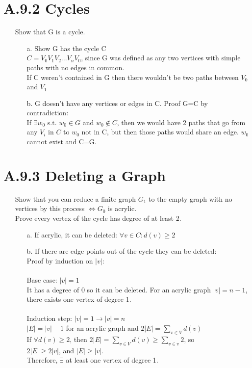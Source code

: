 \documentclass[12pt]{article}
\begin{document}
\section*{A.9.2 Cycles}
\begin{enumerate}
  \item[] Show that G is a cycle.
    \begin{enumerate}
      \item[a.] Show G has the cycle C
        \\ $C = V_0V_1V_2...V_nV_0$, since G was defined as any two vertices with simple paths with no edges in common.
        \\ If C weren't contained in G then there wouldn't be two paths between $V_0$ and $V_1$
      \item[b.]G doesn't have any vertices or edges in C. Proof G=C by contradiction:
        \\ If $\exists w_0$ s.t. $w_0\in G$ and $w_0 \notin C$, then we would have 2 paths that go from any $V_i$ in $C$ to $w_0$ not in C, but then those paths would share an edge. $w_0$ cannot exist and C=G.
    \end{enumerate}
\end{enumerate}

\section*{A.9.3 Deleting a Graph}
\begin{enumerate}
  \item[] Show that you can reduce a finite graph $G_1$ to the empty graph with no vertices by this process $\iff G_0$ is acrylic.
    \\ Prove every vertex of the cycle has degree of at least 2.
    \begin{enumerate}
      \item[a.] If acrylic, it can be deleted: $\forall v \in C : d(v)\geq2$
      \item[b.] If there are edge points out of the cycle they can be deleted:
        \\ Proof by induction on $|v|$:
        \\
        \\ Base case: $|v|=1$ 
        \\ It has a degree of 0 so it can be deleted. For an acrylic graph $|v|=n-1$, there exists one vertex of degree 1.
        \\
        \\ Induction step: $|v|=1 \rightarrow |v|=n$
        \\ $|E|=|v|-1$ for an acrylic graph and $2|E|= \sum_{v\in V} d(v)$
        \\ If $\forall d(v) \geq 2$, then $2|E| = \sum_{v\in V} d(v) \geq \sum_{v\in v} 2$, so 
        \\ $2|E|\geq2|v|$, and $|E|\geq|v|$.
        \\ Therefore, $\exists$ at least one vertex of degree 1.
    \end{enumerate}
\end{enumerate}
\end{document}
